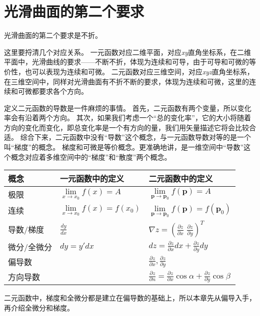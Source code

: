 \section{光滑曲面的第二个要求}

光滑曲面的第二个要求是不折。

这里要捋清几个对应关系。
一元函数对应二维平面，对应{\it xy}直角坐标系，在二维平面中，光滑曲线的要求——不断不折，体现为连续和可导，由于可导和可微的等价性，也可以表现为连续和可微。
二元函数对应三维空间，对应{\it xyz}直角坐标系，在三维空间中，同样对光滑曲面有不折不断的要求，体现为连续和可微，这里的连续和可微都要求各个方向。

定义二元函数的导数是一件麻烦的事情。
首先，二元函数有两个变量，所以变化率会有沿着两个方向。
其次，如果我们考虑一个“总的变化率”，它的大小将随着方向的变化而变化，即总变化率是一个有方向的量，我们用矢量描述它将会比较合适。
综合下来，二元函数中没有“导数”这个概念，与一元函数导数对等的是一个叫“梯度”的概念。
梯度和可微是等价概念。更准确地讲，是一维空间中“导数”这个概念对应着多维空间中的“梯度”和“散度”两个概念。

\begin{table}[h]
\centering
\begin{tabular}{lll}
    \toprule
    概念 & 一元函数中的定义 & 二元函数中的定义\\
    \midrule
    极限        & $\underset{x\rightarrow x_0}{\lim}f\left( x \right) =A$ & $\underset{\boldsymbol{p}\rightarrow \boldsymbol{p}_0}{\lim}f\left( \boldsymbol{p} \right) =A$\\
    连续        & $\underset{x\rightarrow x_0}{\lim}f\left( x \right) =f\left( x_0 \right) $ & $\underset{\boldsymbol{p}\rightarrow \boldsymbol{p}_0}{\lim}f\left( \boldsymbol{p} \right) =f\left( \boldsymbol{p}_0 \right) $\\
    导数/梯度   & $\frac{dy}{dx}$ & $\nabla z=\left( \frac{\partial z}{\partial x}\,\,\frac{\partial z}{\partial y} \right) ^T$\\
    微分/全微分 & $dy=y'dx$ & $dz=\frac{\partial z}{\partial x}dx+\frac{\partial z}{\partial y}dy$\\
    偏导数      &  & $\frac{\partial z}{\partial x},\frac{\partial z}{\partial y}$\\
    方向导数    &  & $\frac{\partial z}{\partial n}=\frac{\partial z}{\partial x}\cos \alpha +\frac{\partial z}{\partial y}\cos \beta $\\
    \bottomrule
\end{tabular}
\end{table}

二元函数中，梯度和全微分都是建立在偏导数的基础上，所以本章先从偏导入手，再介绍全微分和梯度。




